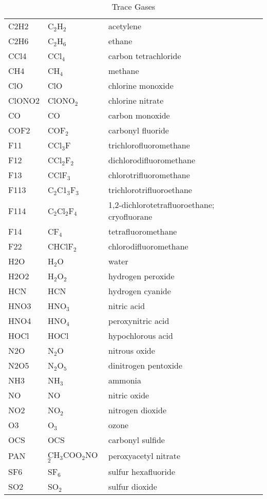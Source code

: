 \begin{table*}[h!]
\caption{Trace Gases}
\begin{tabular}{|l|l|l|}
\hline
\cellcolor[RGB]{188,188,188}{Emitter Name} & \cellcolor[RGB]{188,188,188}{Formula} &
\cellcolor[RGB]{188,188,188}{Name} \\
\hline
\hline
C2H2 & C$_2$H$_2$   & acetylene \\
C2H6 & C$_2$H$_6$   & ethane \\
CCl4 & CCl$_4$      & carbon tetrachloride \\
CH4  & CH$_4$       & methane \\
ClO  & ClO          & chlorine monoxide \\
ClONO2 & ClONO$_2$  & chlorine nitrate \\
CO   & CO           & carbon monoxide  \\
COF2 & COF$_2$      & carbonyl fluoride \\
F11  & CCl$_3$F     & trichlorofluoromethane  \\
F12  & CCl$_2$F$_2$ & dichlorodifluoromethane \\
F13  & CClF$_3$     & chlorotrifluoromethane \\
F113 & C$_2$C1$_3$F$_3$ & trichlorotrifluoroethane \\
F114 & C$_2$Cl$_2$F$_4$ & 1,2-dichlorotetrafluoroethane; cryofluorane \\
F14  & CF$_4$       & tetrafluoromethane \\
F22  & CHClF$_2$    & chlorodifluoromethane  \\
H2O  & H$_2$O       & water \\
H2O2 & H$_2$O$_2$   & hydrogen peroxide  \\
HCN  & HCN          & hydrogen cyanide \\
HNO3 & HNO$_3$      & nitric acid \\
HNO4 & HNO$_4$      & peroxynitric acid  \\
HOCl & HOCl         & hypochlorous acid \\
N2O  & N$_2$O       & nitrous oxide \\
N2O5 & N$_2$O$_5$   & dinitrogen pentoxide \\
NH3  & NH$_3$       & ammonia \\
NO   & NO           & nitric oxide \\
NO2  & NO$_2$       & nitrogen dioxide \\
O3   & O$_3$        & ozone  \\
OCS  & OCS          & carbonyl sulfide \\
PAN  & CH$_3$COO$_2$NO$_2$ & peroxyacetyl nitrate \\
SF6  & SF$_6$       & sulfur hexafluoride \\
SO2  & SO$_2$       & sulfur dioxide  \\
\hline
\end{tabular}
\label{tab:Emitter}
\end{table*} 

